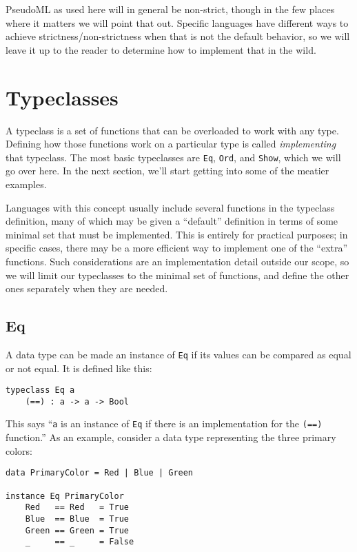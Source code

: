 \documentclass{book}
\newcommand{\mlil}[1]{\lstinline[language=pseudoml,columns=fixed]|#1|}\usepackage{caption}
\begin{document}
PseudoML as used here will in general be non-strict, though in the few places where it matters we will point that out. Specific languages have different ways to achieve strictness/non-strictness when that is not the default behavior, so we will leave it up to the reader to determine how to implement that in the wild.

\section{Typeclasses}

A typeclass is a set of functions that can be overloaded to work with any type. Defining how those functions work on a particular type is called \emph{implementing} that typeclass. The most basic typeclasses are \mlil{Eq}, \mlil{Ord}, and \mlil{Show}, which we will go over here. In the next section, we'll start getting into some of the meatier examples.

Languages with this concept usually include several functions in the typeclass definition, many of which may be given a ``default'' definition in terms of some minimal set that must be implemented. This is entirely for practical purposes; in specific cases, there may be a more efficient way to implement one of the ``extra'' functions. Such considerations are an implementation detail outside our scope, so we will limit our typeclasses to the minimal set of functions, and define the other ones separately when they are needed.

\subsection{Eq}

A data type can be made an instance of \mlil{Eq} if its values can be compared as equal or not equal. It is defined like this:

\begin{lstlisting}[language=pseudoml]
typeclass Eq a
    (==) : a -> a -> Bool
\end{lstlisting}

This says ``\mlil{a} is an instance of \mlil{Eq} if there is an implementation for the \mlil{(==)} function.'' As an example, consider a data type representing the three primary colors:

\begin{lstlisting}[language=pseudoml]
data PrimaryColor = Red | Blue | Green

instance Eq PrimaryColor
    Red   == Red   = True
    Blue  == Blue  = True
    Green == Green = True
    _     == _     = False
\end{lstlisting}
\end{document}
